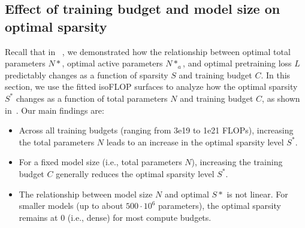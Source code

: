 \subsection{Effect of training budget and model size on optimal \moe sparsity}
\label{app:budget}

Recall that in ~, we demonstrated how the relationship between optimal total parameters $N*$, optimal active parameters $N*_a$, and optimal pretraining loss $L$ predictably changes as a function of sparsity $S$ and training budget $C$. 
In this section, we use the fitted isoFLOP surfaces to analyze how the optimal \moe sparsity $S^*$ changes as a function of total parameters $N$ and training budget $C$, as shown in~. Our main findings are:
\begin{itemize}[left=0pt,itemsep=2pt]
    \item Across all training budgets (ranging from 3e19 to 1e21 FLOPs), increasing the total parameters $N$ leads to an increase in the optimal sparsity level $S^*$. 
    \item For a fixed model size (i.e., total parameters $N$), increasing the training budget $C$ generally reduces the optimal sparsity level $S^*$. 
    \item The relationship between model size $N$ and optimal $S*$ is not linear. For smaller models (up to about $500 \cdot 10^6$  parameters), the optimal sparsity remains at $0$ (i.e., dense) for most compute budgets. 
\end{itemize}




